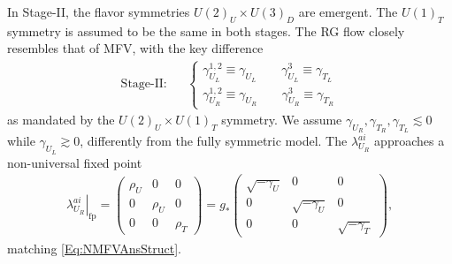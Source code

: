 \documentclass[aps,prl,twocolumn,showpacs,10pt,preprintnumbers,nofootinbib]{revtex4-2}
\newcommand{\gst}{g_*}
\newcommand{\fp}[1]{{\left.#1\right|_{\text{fp}}}}
\begin{document}
{In Stage-II, the flavor symmetries $U(2)_U \times U(3)_D$ are emergent. The $U(1)_T$ symmetry is assumed to be the same in both stages. The RG flow closely resembles that of MFV, with the key difference
\begin{align}
    \text{Stage-II:}&&\begin{cases}
        \gamma_{U_L}^{1,2}\equiv \gamma_{U_L}\quad \quad \gamma_{U_L}^3 \equiv \gamma_{T_L}\\
        \gamma_{U_R}^{1,2}\equiv \gamma_{U_R} \quad \quad \gamma_{U_R}^3 \equiv \gamma_{T_R}
    \end{cases}
\end{align}
as mandated by the $U(2)_U\times U(1)_T$ symmetry. We assume $\gamma_{U_R},\gamma_{T_R},\gamma_{T_L}\lesssim0$ while $\gamma_{U_L}\gtrsim0$, differently from the fully symmetric model. The $\lambda_{U_R}^{ai}$ approaches a non-universal fixed point
\begin{align}\label{Eq:NMFVRH}
    \fp{\lambda_{U_R}^{ai}} = \begin{pmatrix}
        \rho_U& 0 & 0 \\
        0 & \rho_U & 0 \\
        0 & 0 & \rho_T
    \end{pmatrix}=\gst\begin{pmatrix}
        \sqrt{-\gamma_U} & 0 & 0 \\
        0 & \sqrt{-\gamma_U} & 0 \\
        0 & 0 & \sqrt{-\gamma_T}
    \end{pmatrix},
\end{align}
matching \eqref{Eq:NMFVAnsStruct}. 

}
\end{document}

